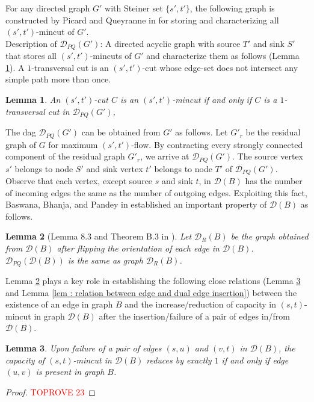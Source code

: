 \documentclass[letterpaper,11pt]{article}
\newtheorem{lemma}{Lemma}[]
\begin{document}
For any directed graph $G'$ with Steiner set $\{s',t'\}$, the following graph is constructed by Picard and Queyranne in \cite{DBLP:journals/mp/PicardQ80} for storing and characterizing all $(s',t')$-mincut of $G'$.\\

\noindent
Description of ${\mathcal D}_{PQ}(G')$: A directed acyclic graph with source $T'$ and sink $S'$ that stores all $(s',t')$-mincuts of $G'$ and characterize them as follows (Lemma \ref{lem : characterization of s,t mincut}). A $1$-transversal cut is an $(s',t')$-cut whose edge-set does not intersect any simple path more than once.
\begin{lemma}\label{lem : characterization of s,t mincut}
    An $(s',t')$-cut $C$ is an $(s',t')$-mincut if and only if $C$ is a $1$-transversal cut in ${\mathcal D}_{PQ}(G')$,
\end{lemma}
The dag ${\mathcal D}_{PQ}(G')$ can be obtained from $G'$ as follows. Let $G'_r$ be the residual graph of $G$ for maximum $(s',t')$-flow. By contracting every strongly connected component of the residual graph $G'_r$, we arrive at ${\mathcal D}_{PQ}(G')$. The source vertex $s'$ belongs to node $S'$ and sink vertex $t'$ belongs to node $T'$ of ${\mathcal D}_{PQ}(G')$.\\

Observe that each vertex, except source $s$ and sink $t$, in ${\mathcal D}(B)$ has the number of incoming edges the same as the number of outgoing edges. Exploiting this fact, Baswana, Bhanja, and Pandey in \cite{DBLP:journals/talg/BaswanaBP23} established an important property of ${\mathcal D}(B)$ as follows.
\begin{lemma}[Lemma 8.3 and Theorem B.3 in \cite{DBLP:journals/talg/BaswanaBP23}] \label{lem : D_PQ is same as D}
    Let ${\mathcal D}_{R}(B)$ be the graph obtained from ${\mathcal D}(B)$ after flipping the orientation of each edge in ${\mathcal D}(B)$. ${\mathcal D}_{PQ}({\mathcal D}(B))$ is the same as graph ${\mathcal D}_R(B)$.
\end{lemma}
Lemma \ref{lem : D_PQ is same as D} plays a key role in establishing the following close relations (Lemma \ref{lem : relation between edge and dual edge failure} and Lemma \ref{lem : relation between edge and dual edge insertion}) between the existence of an edge in graph $B$ and the increase/reduction of capacity in $(s,t)$-mincut in graph ${\mathcal D}(B)$ after the insertion/failure of a pair of edges in/from ${\mathcal D}(B)$. 
\begin{lemma} \label{lem : relation between edge and dual edge failure}
    Upon failure of a pair of edges $(s,u)$ and $(v,t)$ in ${\mathcal D}(B)$, the capacity of $(s,t)$-mincut in ${\mathcal D}(B)$ reduces by exactly $1$ if and only if edge $(u,v)$ is present in graph $B$. 
\end{lemma}
\begin{proof}\textcolor{red}{TOPROVE 23}\end{proof}
\end{document}
